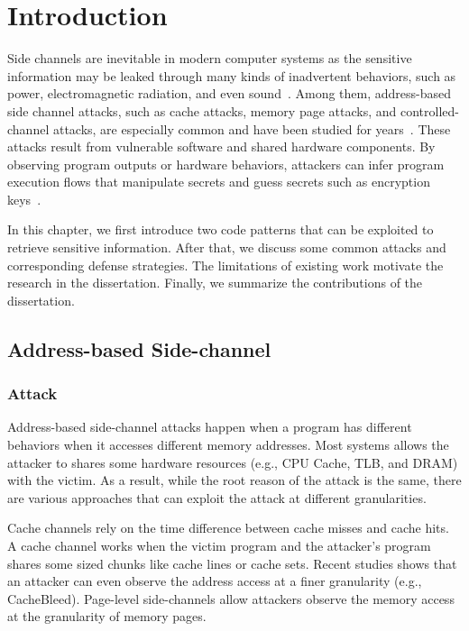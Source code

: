 
\chapter{Introduction} \label{chapter1}

Side channels are inevitable in modern computer systems as the sensitive
information may be leaked through many kinds of inadvertent behaviors, such as power, electromagnetic radiation, and even
sound~\cite{agrawal2002side,kar20178,chari1999towards,217605,genkin2014rsa}.
Among them, address-based side channel attacks, such as cache attacks, memory page attacks, and controlled-channel attacks, are especially common and have been studied for years~\cite{7163052,217543,217589,lee2017inferring,191010,liu2015last}. These
attacks result from vulnerable software and shared hardware components.
By observing program outputs or hardware behaviors, attackers can infer program
execution flows that manipulate secrets and guess secrets such as encryption
keys~\cite{Osvik2006,Gullasch:2011:CGB:2006077.2006784,203878,10.1007/978-3-540-45238-6_6}.

In this chapter, we first introduce two code patterns that can be exploited to retrieve sensitive information. After that, we discuss some common attacks and corresponding defense strategies. The limitations of existing work motivate the research in the dissertation. Finally, we summarize the contributions of the dissertation.

\section{Address-based Side-channel}
\subsection{Attack}
Address-based side-channel attacks happen when a program has different behaviors when it accesses different memory addresses. Most systems allows the attacker to shares some hardware resources (e.g., CPU Cache, TLB, and DRAM) with the victim. As a result, while the root reason of the attack is the same, there are various approaches that can exploit the attack at different granularities. 

Cache channels rely on the time difference between cache misses and cache hits. A cache channel works when the victim program and the attacker's program shares some sized chunks like cache lines or cache sets. Recent studies shows that an attacker can even observe the address access at a finer granularity (e.g., CacheBleed). Page-level side-channels allow attackers observe the memory access at the granularity of memory pages. 

